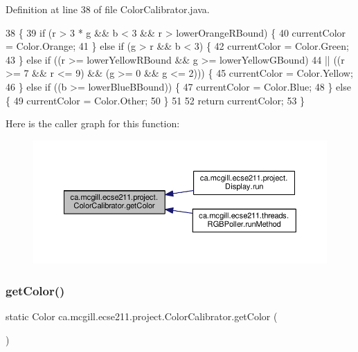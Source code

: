 Definition at line 38 of file Color\+Calibrator.\+java.


\begin{DoxyCode}
38                                                     \{
39     \textcolor{keywordflow}{if} (r > 3 * g && b < 3 && r > lowerOrangeRBound) \{
40       currentColor = Color.Orange;
41     \} \textcolor{keywordflow}{else} \textcolor{keywordflow}{if} (g > r && b < 3) \{
42       currentColor = Color.Green;
43     \} \textcolor{keywordflow}{else} \textcolor{keywordflow}{if} ((r >= lowerYellowRBound && g >= lowerYellowGBound)
44         || ((r >= 7 && r <= 9) && (g >= 0 && g <= 2))) \{
45       currentColor = Color.Yellow;
46     \} \textcolor{keywordflow}{else} \textcolor{keywordflow}{if} ((b >= lowerBlueBBound)) \{
47       currentColor = Color.Blue;
48     \} \textcolor{keywordflow}{else} \{
49       currentColor = Color.Other;
50     \}
51 
52     \textcolor{keywordflow}{return} currentColor;
53   \}
\end{DoxyCode}
Here is the caller graph for this function\+:\nopagebreak
\begin{figure}[H]
\begin{center}
\leavevmode
\includegraphics[width=350pt]{classca_1_1mcgill_1_1ecse211_1_1project_1_1_color_calibrator_a92e653a6a9f7a31cb7b6f9bc2e732133_icgraph}
\end{center}
\end{figure}
\mbox{\label{classca_1_1mcgill_1_1ecse211_1_1project_1_1_color_calibrator_a1acf05f9523b2c0f329d4a7cbf1b9c47}} 
\subsubsection{\texorpdfstring{get\+Color()}{getColor()}\hspace{0.1cm}{\footnotesize\ttfamily [2/2]}}
{\footnotesize\ttfamily static Color ca.\+mcgill.\+ecse211.\+project.\+Color\+Calibrator.\+get\+Color (\begin{DoxyParamCaption}{ }\end{DoxyParamCaption})\hspace{0.3cm}{\ttfamily [static]}}

